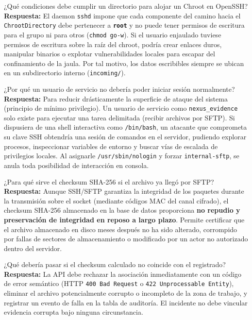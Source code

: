 \documentclass[10pt,a4paper]{article}
\begin{document}
\begin{pregunta}{¿Qué condiciones debe cumplir un directorio para alojar un Chroot en OpenSSH?}
    \textbf{Respuesta:} El daemon \texttt{sshd} impone que cada componente del camino hacia el \texttt{ChrootDirectory} debe pertenecer a \textbf{\texttt{root}} y no puede tener permisos de escritura para el grupo ni para otros (\texttt{chmod go-w}). Si el usuario enjaulado tuviese permisos de escritura sobre la raíz del chroot, podría crear enlaces duros, manipular binarios o explotar vulnerabilidades locales para escapar del confinamiento de la jaula. Por tal motivo, los datos escribibles siempre se ubican en un subdirectorio interno (\texttt{incoming/}).
\end{pregunta}

\begin{pregunta}{¿Por qué un usuario de servicio no debería poder iniciar sesión normalmente?}
    \textbf{Respuesta:} Para reducir drásticamente la superficie de ataque del sistema (principio de mínimo privilegio). Un usuario de servicio como \texttt{nexus\_evidence} solo existe para ejecutar una tarea delimitada (recibir archivos por SFTP). Si dispusiera de una shell interactiva como \texttt{/bin/bash}, un atacante que comprometa su clave SSH obtendría una sesión de comandos en el servidor, pudiendo explorar procesos, inspeccionar variables de entorno y buscar vías de escalada de privilegios locales. Al asignarle \texttt{/usr/sbin/nologin} y forzar \texttt{internal-sftp}, se anula toda posibilidad de interacción en consola.
\end{pregunta}

\begin{pregunta}{¿Para qué sirve el checksum SHA-256 si el archivo ya llegó por SFTP?}
    \textbf{Respuesta:} Aunque SSH/SFTP garantiza la integridad de los paquetes durante la transmisión sobre el socket (mediante códigos MAC del canal cifrado), el checksum SHA-256 almacenado en la base de datos proporciona \textbf{no repudio y preservación de integridad en reposo a largo plazo}. Permite certificar que el archivo almacenado en disco meses después no ha sido alterado, corrompido por fallas de sectores de almacenamiento o modificado por un actor no autorizado dentro del servidor.
\end{pregunta}

\begin{pregunta}{¿Qué debería pasar si el checksum calculado no coincide con el registrado?}
    \textbf{Respuesta:} La API debe rechazar la asociación inmediatamente con un código de error semántico (HTTP \texttt{400 Bad Request} o \texttt{422 Unprocessable Entity}), eliminar el archivo potencialmente corrupto o incompleto de la zona de trabajo, y registrar un evento de falla en la tabla de auditoría. El incidente no debe vincular evidencia corrupta bajo ninguna circunstancia.
\end{pregunta}
\end{document}
